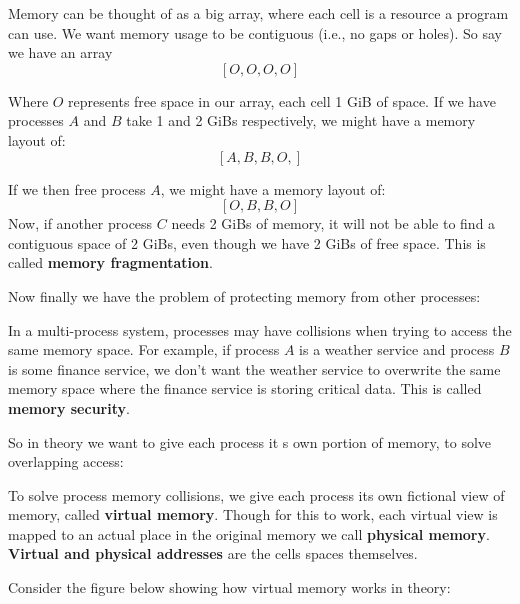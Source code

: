 \begin{Def}
    
    Memory can be thought of as a big array, where each cell is a resource a program can use.
    We want memory usage to be contiguous (i.e., no gaps or holes). So say we have an array 
    $$[O, O, O, O]$$

    \noindent
    Where $O$ represents free space in our array, each cell 1 GiB of space. If we have processes $A$ and $B$ take 1 and 2 GiBs respectively, we might have a memory layout of:
    $$[A, B, B, O,]$$

    \noindent
    If we then free process $A$, we might have a memory layout of:
    $$[O, B, B, O]$$
    \noindent
    Now, if another process $C$ needs 2 GiBs of memory, it will not be able to find a contiguous space of 2 GiBs, even though we have 2 GiBs of free space.
    This is called \textbf{memory fragmentation}.
\end{Def}

\noindent
Now finally we have the problem of protecting memory from other processes:

\begin{Def}

    In a multi-process system, processes may have collisions when trying to access the same memory space.
    For example, if process $A$ is a weather service and process $B$ is some finance service, we don't want 
    the weather service to overwrite the same memory space where the finance service is storing critical data.
    This is called \textbf{memory security}.
\end{Def}

\noindent
So in theory we want to give each process it s own portion of memory, to solve overlapping access:
\begin{Def}

    To solve process memory collisions, we give each process its own fictional view of memory, called \textbf{virtual memory}.
    Though for this to work, each virtual view is mapped to an actual place in the original memory we call \textbf{physical memory}.\\

    \noindent
    \textbf{Virtual and physical addresses} are the cells spaces themselves.
\end{Def}

\newpage 

\noindent
Consider the figure below showing how virtual memory works in theory:

